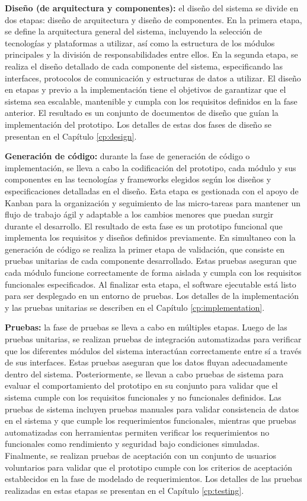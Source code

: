 \textbf{Diseño (de arquitectura y componentes):}
el diseño del sistema se divide en dos etapas: diseño de arquitectura y diseño de componentes. En la primera etapa, se define la arquitectura general del sistema, incluyendo la selección de tecnologías y plataformas a utilizar, así como la estructura de los módulos principales y la división de responsabilidades entre ellos. En la segunda etapa, se realiza el diseño detallado de cada componente del sistema, especificando las interfaces, protocolos de comunicación y estructuras de datos a utilizar. El diseño en etapas y previo a la implementación tiene el objetivos de garantizar que el sistema sea escalable, mantenible y cumpla con los requisitos definidos en la fase anterior. El resultado es un conjunto de documentos de diseño que guían la implementación del prototipo. Los detalles de estas dos fases de diseño se presentan en el Capítulo \ref{cp:design}.

\textbf{Generación de código:}
durante la fase de generación de código o implementación, se lleva a cabo la codificación del prototipo, cada módulo y sus componentes en las tecnologías y frameworks elegidos según los diseños y especificaciones detalladas en el diseño. Esta etapa es gestionada con el apoyo de Kanban para la organización y seguimiento de las micro-tareas para mantener un flujo de trabajo ágil y adaptable a los cambios menores que puedan surgir durante el desarrollo. El resultado de esta fase es un prototipo funcional que implementa los requisitos y diseños definidos previamente. En simultaneo con la generación de código se realiza la primer etapa de validación, que consiste en pruebas unitarias de cada componente desarrollado. Estas pruebas aseguran que cada módulo funcione correctamente de forma aislada y cumpla con los requisitos funcionales especificados. Al finalizar esta etapa, el software ejecutable está listo para ser desplegado en un entorno de pruebas. Los detalles de la implementación y las pruebas unitarias se describen en el Capítulo \ref{cp:implementation}.

\textbf{Pruebas:} 
la fase de pruebas se lleva a cabo en múltiples etapas. Luego de las pruebas unitarias, se realizan pruebas de integración automatizadas para verificar que los diferentes módulos del sistema interactúan correctamente entre sí a través de sus interfaces. Estas pruebas aseguran que los datos fluyan adecuadamente dentro del sistema. Posteriormente, se llevan a cabo pruebas de sistema para evaluar el comportamiento del prototipo en su conjunto para validar que el sistema cumple con los requisitos funcionales y no funcionales definidos. Las pruebas de sistema incluyen pruebas manuales para validar consistencia de datos en el sistema y que cumple los requerimientos funcionales, mientras que pruebas automatizadas con herramientas permiten verificar los requerimientos no funcionales como rendimiento y seguridad bajo condiciones simuladas. Finalmente, se realizan pruebas de aceptación con un conjunto de usuarios voluntarios para validar que el prototipo cumple con los criterios de aceptación establecidos en la fase de modelado de requerimientos. Los detalles de las pruebas realizadas en estas etapas se presentan en el Capítulo \ref{cp:testing}.

